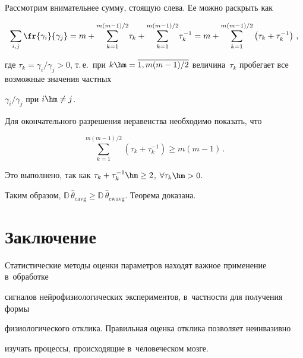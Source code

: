 Рассмотрим внимательнее сумму, стоящую слева. Ее можно раскрыть как


$$


\sum\limits_{i,j} \fr{\gamma_i}{\gamma_j} = m + \sum\limits_{k=1}^{m(m-1)/2} 


\!\tau_k + \sum\limits_{k=1}^{m(m-1)/2} \!\tau_k^{-1} = m + \sum\limits_{k=1}^{m(m-


1)/2} \left(\tau_k + \tau_k^{-1}\right)\,,


$$


где $\tau_k = {\gamma_i}/{\gamma_j} > 0$, т.\,е.\ при $k \hm= \overline{1,m(m-


1)/2}$ величина~$\tau_k$ пробегает все возможные значения частных 


${\gamma_i}/{\gamma_j}$ при $i \hm\ne j$.





\pagebreak





Для окончательного разрешения неравенства необходимо показать, что 


$$


\sum\limits_{k=1}^{m(m-1)/2} \left(\tau_k + \tau_k^{-1}\right) \ge m(m-1)\,.


$$ 


Это  выполнено, так как $\tau_k + \tau_k^{-1} \hm\ge 2$, $\forall \tau_k \hm> 0$.








Таким образом, $\mathbb{D}\,\hat{\theta}_{\mathrm{cavg}} \ge 


\mathbb{D}\,\hat{\theta}_{\mathrm{cwavg}}$. Теорема доказана.





\section{Заключение}





Статистические методы оценки параметров находят важное применение в~обработке 


сигналов нейрофизиологических экспериментов, в~част\-ности для получения формы 


физиологического отклика. Правильная оценка отклика позволяет неинвазивно 


изучать процессы, происходящие в~человеческом мозге.








